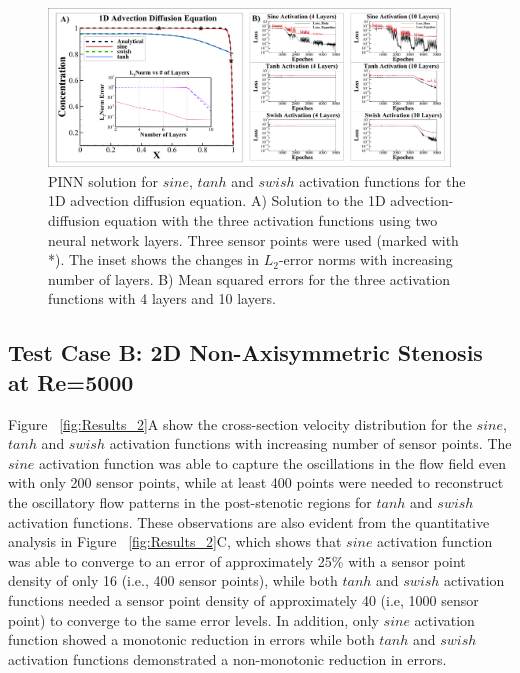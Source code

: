 \documentclass[times,twocolumn,final]{elsarticle}
\begin{document}
{%
\begin{figure}[!t]
\centering
\includegraphics[width=0.95\textwidth]{./Figures/Figure3_AdvectionDiffusion}
\caption{PINN solution for $sine$, $tanh$ and $swish$ activation functions for the 1D advection diffusion equation. A) Solution to the 1D advection-diffusion equation with the three activation functions using two neural network layers. Three sensor points were used (marked with *). The inset shows the changes in $L_{2}$-error norms with increasing number of layers. B) Mean squared errors for the three activation functions with 4 layers and 10 layers.}
\label{Figure:Results_1}
\end{figure}

\subsection{Test Case B: 2D Non-Axisymmetric Stenosis at Re=5000}
Figure ~\ref{fig:Results_2}A show the cross-section velocity distribution for the $sine$, $tanh$ and $swish$ activation functions with increasing number of sensor points. The $sine$ activation function was able to capture the oscillations in the flow field even with only 200 sensor points, while at least 400 points were needed to reconstruct the oscillatory flow patterns in the post-stenotic regions for $tanh$ and $swish$ activation functions. These observations are also evident from the quantitative analysis in Figure ~\ref{fig:Results_2}C, which shows that $sine$ activation function was able to converge to an error of approximately 25\% with a sensor point density of only 16 (i.e., 400 sensor points), while both $tanh$ and $swish$ activation functions needed a sensor point density of approximately 40 (i.e, 1000 sensor point) to converge to the same error levels. In addition, only $sine$ activation function showed a monotonic reduction in errors while both $tanh$ and $swish$ activation functions demonstrated a non-monotonic reduction in errors. 



}
\end{document}
